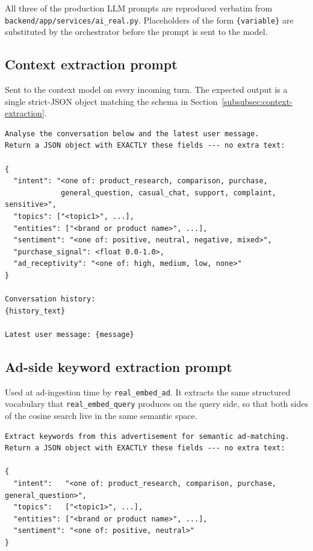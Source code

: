 \begin{appendices}
All three of the production LLM prompts are reproduced verbatim from
\texttt{backend/app/services/ai\_real.py}. Placeholders of the form
\texttt{\{variable\}} are substituted by the orchestrator before the
prompt is sent to the model.

\subsection*{Context extraction prompt}

Sent to the context model on every incoming turn. The expected
output is a single strict-JSON object matching the schema in
Section~\ref{subsubsec:context-extraction}.

\begin{lstlisting}[style=promptstyle, caption={Context extraction prompt
    (\texttt{real\_extract\_context}).}]
Analyse the conversation below and the latest user message.
Return a JSON object with EXACTLY these fields --- no extra text:

{
  "intent": "<one of: product_research, comparison, purchase,
             general_question, casual_chat, support, complaint, sensitive>",
  "topics": ["<topic1>", ...],
  "entities": ["<brand or product name>", ...],
  "sentiment": "<one of: positive, neutral, negative, mixed>",
  "purchase_signal": <float 0.0-1.0>,
  "ad_receptivity": "<one of: high, medium, low, none>"
}

Conversation history:
{history_text}

Latest user message: {message}
\end{lstlisting}

\subsection*{Ad-side keyword extraction prompt}

Used at ad-ingestion time by \texttt{real\_embed\_ad}. It extracts the
same structured vocabulary that \texttt{real\_embed\_query} produces on
the query side, so that both sides of the cosine search live in the
same semantic space.

\begin{lstlisting}[style=promptstyle, caption={Ad keyword extraction prompt
    (\texttt{real\_embed\_ad}).}]
Extract keywords from this advertisement for semantic ad-matching.
Return a JSON object with EXACTLY these fields --- no extra text:

{
  "intent":   "<one of: product_research, comparison, purchase, general_question>",
  "topics":   ["<topic1>", ...],
  "entities": ["<brand or product name>", ...],
  "sentiment": "<one of: positive, neutral>"
}


\end{lstlisting}
\end{appendices}
